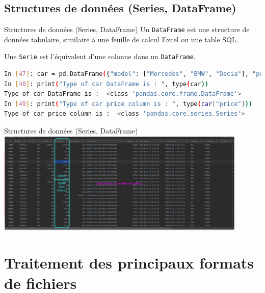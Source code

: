 \documentclass{beamer}
\begin{document}
    \subsection{Structures de données (Series, DataFrame)}
    \begin{frame}[fragile]{Structures de données (Series, DataFrame)}
        Un \lstinline{DataFrame} est une structure de données tabulaire, similaire à une feuille de calcul Excel ou une table SQL.

        Une \lstinline{Serie} est l'équivalent d'une colonne dans un \lstinline{DataFrame}.
        \begin{lstlisting}[language=bash]
In [47]: car = pd.DataFrame({"model": ["Mercedes", "BMW", "Dacia"], "price": [41_000, 37_000, 15_000]})
In [48]: print("Type of car DataFrame is : ", type(car))
Type of car DataFrame is :  <class 'pandas.core.frame.DataFrame'>
In [49]: print("Type of car price column is : ", type(car["price"]))
Type of car price column is :  <class 'pandas.core.series.Series'>
        \end{lstlisting}
    \end{frame}

    \begin{frame}{Structures de données (Series, DataFrame)}
        \centering
        \includegraphics[width=12cm]{image/dataframe-n-series}
    \end{frame}


    \section{Traitement des principaux formats de fichiers}
\end{document}
